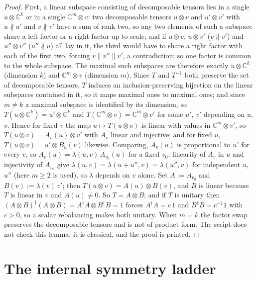 \documentclass[11pt]{article}
\theoremstyle{definition}
\newcommand{\C}{\mathbb{C}}
\begin{document}
\begin{proof}
First, a linear subspace consisting of decomposable tensors lies in a single $u \otimes \C^{k}$ or in a single $\C^{m} \otimes v$: two decomposable tensors $u \otimes v$ and $u' \otimes v'$ with $u \nparallel u'$ and $v \nparallel v'$ have a sum of rank two, so any two elements of such a subspace share a left factor or a right factor up to scale; and if $u \otimes v$, $u \otimes v'$ ($v \nparallel v'$) and $u'' \otimes v''$ ($u'' \nparallel u$) all lay in it, the third would have to share a right factor with each of the first two, forcing $v \parallel v''\parallel v'$, a contradiction; so one factor is common to the whole subspace. The maximal such subspaces are therefore exactly $u \otimes \C^{k}$ (dimension $k$) and $\C^{m} \otimes v$ (dimension $m$). Since $T$ and $T^{-1}$ both preserve the set of decomposable tensors, $T$ induces an inclusion-preserving bijection on the linear subspaces contained in it, so it maps maximal ones to maximal ones; and since $m \neq k$ a maximal subspace is identified by its dimension, so $T(u \otimes \C^{k}) = u' \otimes \C^{k}$ and $T(\C^{m} \otimes v) = \C^{m} \otimes v'$ for some $u'$, $v'$ depending on $u$, $v$. Hence for fixed $v$ the map $u \mapsto T(u \otimes v)$ is linear with values in $\C^{m} \otimes v'$, so $T(u \otimes v) = A_{v}(u) \otimes v'$ with $A_{v}$ linear and injective; and for fixed $u$, $T(u \otimes v) = u' \otimes B_{u}(v)$ likewise. Comparing, $A_{v}(u)$ is proportional to $u'$ for every $v$, so $A_{v}(u) = \lambda(u, v)\,A_{v_{0}}(u)$ for a fixed $v_{0}$; linearity of $A_{v}$ in $u$ and injectivity of $A_{v_{0}}$ give $\lambda(u, v) = \lambda(u + u'', v) = \lambda(u'', v)$ for independent $u$, $u''$ (here $m \ge 2$ is used), so $\lambda$ depends on $v$ alone. Set $A := A_{v_{0}}$ and $B(v) := \lambda(v)\,v'$; then $T(u \otimes v) = A(u) \otimes B(v)$, and $B$ is linear because $T$ is linear in $v$ and $A(u) \neq 0$. So $T = A \otimes B$; and if $T$ is unitary then $(A \otimes B)^{\dagger}(A \otimes B) = A^{\dagger}A \otimes B^{\dagger}B = 1$ forces $A^{\dagger}A = c\,1$ and $B^{\dagger}B = c^{-1}1$ with $c > 0$, so a scalar rebalancing makes both unitary. When $m = k$ the factor swap preserves the decomposable tensors and is not of product form. The script does not check this lemma; it is classical, and the proof is printed.
\end{proof}

\section{The internal symmetry ladder}\label{sec:ladder}
\end{document}

